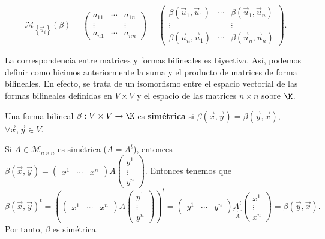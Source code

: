 \[ \mathcal{M}_{ \left\{ \vec{u}_{i}\right\} }\left(\beta \right) = \begin{pmatrix} a_{11} & \cdots & a_{1n} \\
\vdots & & \vdots \\
a_{n1} & \cdots & a_{nn}\end{pmatrix} = \begin{pmatrix} \beta\left(\vec{u}_{1}, \vec{u}_{1}\right) & \cdots & \beta\left(\vec{u}_{1}, \vec{u}_{n}\right)\\
\vdots & & \vdots \\
\beta\left(\vec{u}_{n}, \vec{u}_{1}\right) & \cdots & \beta\left(\vec{u}_{n}, \vec{u}_{n}\right)\end{pmatrix}.\]
\begin{observation}
\normalfont 
La correspondencia entre matrices y formas bilineales es biyectiva. Así, podemos definir como hicimos anteriormente la suma y el producto de matrices de forma bilineales. En efecto, se trata de un isomorfismo entre el espacio vectorial de las formas bilineales definidas en $\displaystyle V \times V$ y el espacio de las matrices $\displaystyle n \times n $ sobre $\displaystyle \K $.
\end{observation}
\begin{fdefinition}[]
\normalfont Una forma bilineal $\displaystyle \beta : V \times V \to \K $ es \textbf{simétrica} si $\displaystyle \beta\left(\vec{x}, \vec{y}\right) = \beta\left(\vec{y}, \vec{x}\right) $, $\displaystyle \forall \vec{x}, \vec{y} \in V $.
\end{fdefinition}
\begin{observation}
	\normalfont Si $\displaystyle A \in \mathcal{M}_{n \times n} $ es simétrica ($\displaystyle A = A^{t} $), entonces $\displaystyle \beta\left(\vec{x}, \vec{y}\right) = \begin{pmatrix} x^{1} & \cdots & x^{n} \end{pmatrix} A \begin{pmatrix} y^{1} \\ \vdots \\ y^{n} \end{pmatrix} $. Entonces tenemos que 
	\[\beta\left(\vec{x}, \vec{y}\right)^{t} = \left(\begin{pmatrix} x^{1} & \cdots & x^{n} \end{pmatrix} A \begin{pmatrix} y^{1} \\ \vdots \\ y^{n} \end{pmatrix}\right)^{t} = \begin{pmatrix} y^{1} & \cdots & y^{n} \end{pmatrix} \underbrace{A^{t}}_{A} \begin{pmatrix} x^{1} \\ \vdots \\ x^{n} \end{pmatrix} = \beta\left(\vec{y}, \vec{x}\right).\]
	Por tanto, $\displaystyle \beta  $ es simétrica.
\end{observation}

